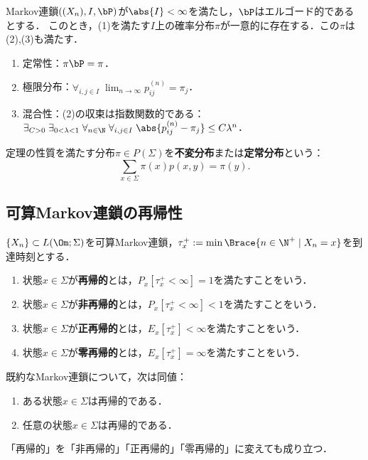 \documentclass[uplatex,dvipdfmx]{jsreport}
\begin{document}
\begin{theorem}[有限状態Markov過程のエルゴード定理]
    Markov連鎖$((X_n),I,\bP)$が$\abs{I}<\infty$を満たし，$\bP$はエルゴード的であるとする．
    このとき，(1)を満たす$I$上の確率分布$\pi$が一意的に存在する．この$\pi$は(2),(3)も満たす．
    \begin{enumerate}
        \item 定常性：$\pi\bP=\pi$．
        \item 極限分布：$\forall_{i,j\in I}\;\lim_{n\to\infty}p_{ij}^{(n)}=\pi_j$．
        \item 混合性：(2)の収束は指数関数的である：$\exists_{C>0}\;\exists_{0<\lambda<1}\;\forall_{n\in\N}\;\forall_{i,j\in I}\;\abs{p_{ij}^{(n)}-\pi_j}\le C\lambda^n$．
    \end{enumerate}
\end{theorem}

\begin{definition}
    定理の性質を満たす分布$\pi\in P(\Sigma)$を\textbf{不変分布}または\textbf{定常分布}という：
    \[\sum_{x\in\Sigma}\pi(x)p(x,y)=\pi(y).\]
\end{definition}

\subsection{可算Markov連鎖の再帰性}

\begin{definition}
    $\{X_n\}\subset L(\Om;\Sigma)$を可算Markov連鎖，$\tau_x^+:=\min\Brace{n\in\N^+\mid X_n=x}$を到達時刻とする．
    \begin{enumerate}
        \item 状態$x\in\Sigma$が\textbf{再帰的}とは，$P_x[\tau_x^+<\infty]=1$を満たすことをいう．
        \item 状態$x\in\Sigma$が\textbf{非再帰的}とは，$P_x[\tau_x^+<\infty]<1$を満たすことをいう．
        \item 状態$x\in\Sigma$が\textbf{正再帰的}とは，$E_x[\tau_x^+]<\infty$を満たすことをいう．
        \item 状態$x\in\Sigma$が\textbf{零再帰的}とは，$E_x[\tau_x^+]=\infty$を満たすことをいう．
    \end{enumerate}
\end{definition}

\begin{proposition}
    既約なMarkov連鎖について，次は同値：
    \begin{enumerate}
        \item ある状態$x\in\Sigma$は再帰的である．
        \item 任意の状態$x\in\Sigma$は再帰的である．
    \end{enumerate}
    「再帰的」を「非再帰的」「正再帰的」「零再帰的」に変えても成り立つ．
\end{proposition}
\end{document}
